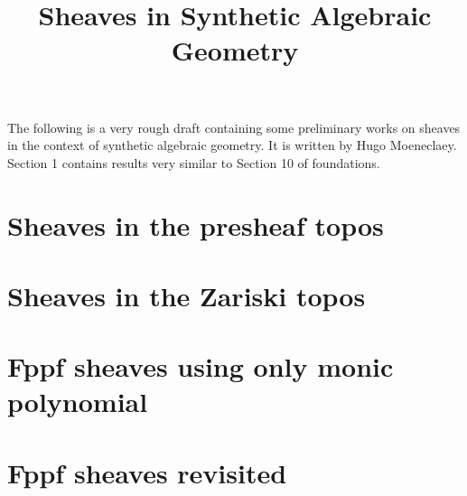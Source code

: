 \documentclass{../util/zariski}
\title{Sheaves in Synthetic Algebraic Geometry}
\begin{document}
\maketitle

The following is a very rough draft containing some preliminary works on sheaves in the context of synthetic algebraic geometry. It is written by Hugo Moeneclaey. Section 1 contains results very similar to Section 10 of foundations.

\tableofcontents

\section{Sheaves in the presheaf topos}


\section{Sheaves in the Zariski topos}


\section{Fppf sheaves using only monic polynomial}


\section{Fppf sheaves revisited}




\printindex

\printbibliography
\end{document}
